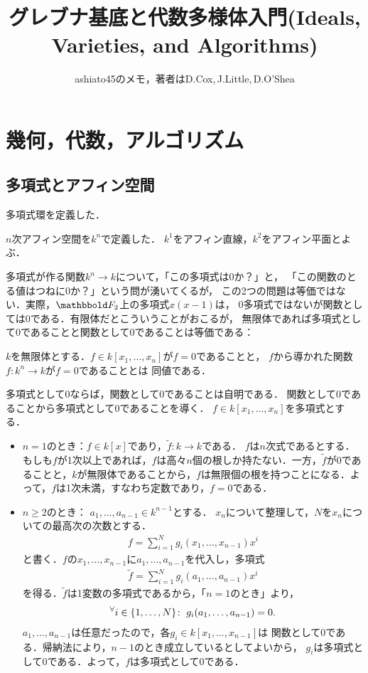 \documentclass[9pt]{ltjsarticle}
\title{グレブナ基底と代数多様体入門(Ideals, Varieties, and Algorithms)}
\author{ashiato45のメモ，著者はD.Cox,\,J.Little,\,D.O'Shea}
\begin{document}
\maketitle

\section{幾何，代数，アルゴリズム}
\subsection{多項式とアフィン空間}

多項式環を定義した．

$n$次アフィン空間を$k^n$で定義した．
$k^1$をアフィン直線，$k^2$をアフィン平面とよぶ．

多項式が作る関数$k^n \to k$について，「この多項式は0か？」と，
「この関数のとる値はつねに0か？」という問が湧いてくるが，
この2つの問題は等価ではない．実際，$\F_2$上の多項式$x(x-1)$は，
0多項式ではないが関数としては0である．有限体だとこういうことがおこるが，
無限体であれば多項式として0であることと関数として0であることは等価である：
\begin{myproposition}
 $k$を無限体とする．$f\in k[x_1,\dots,x_n]$が$f=0$であることと，
 $f$から導かれた関数$f \colon k^n \to k$が$f = 0$であることとは
同値である．
\end{myproposition}
\begin{myproof}
 多項式として0ならば，関数として0であることは自明である．
関数として0であることから多項式として0であることを導く．
$f\in k[x_1,\dots,x_n]$を多項式とする．
\begin{itemize}
 \item $n=1$のとき：$f\in k[x]$であり，$\tilde f\colon k\to k$である．
$f$は$n$次式であるとする．もしも$f$が1次以上であれば，$f$は高々$n$個の根しか持たない．一方，$\tilde f$が0であることと，$k$が無限体であることから，$f$は無限個の根を持つことになる．よって，$f$は1次未満，すなわち定数であり，$f=0$である．
 \item $n\ge 2$のとき：
$a_1,\dots,a_{n-1}\in k^{n-1}$とする．
$x_n$について整理して，$N$を$x_n$についての最高次の次数とする．
\begin{align}
 f = \sum_{i=1}^N g_i(x_1,\dots,x_{n-1})x^i
\end{align}
と書く．$f$の$x_1,\dots,x_{n-1}$に$a_1,\dots,a_{n-1}$を代入し，多項式
\begin{align}
 \tilde f = \sum_{i=1}^N g_i(a_1,\dots,a_{n-1})x^i
\end{align}
を得る．$\tilde f$は1変数の多項式であるから，「$n=1$のとき」より，
\begin{align}
 {}^{\forall}{i \in \left\{1,\dots,N\right\}}\mathrm{\colon\;} g_i(a_1,\dots,a_{n-1})  = 0.
\end{align}
$a_1,\dots,a_{n-1}$は任意だったので，各$g_i \in k[x_1,\dots,x_{n-1}]$は
関数として0である．帰納法により，$n-1$のとき成立しているとしてよいから，
$g_i$は多項式として0である．よって，$f$は多項式として0である．
\end{itemize}
\end{myproof}
\end{document}
